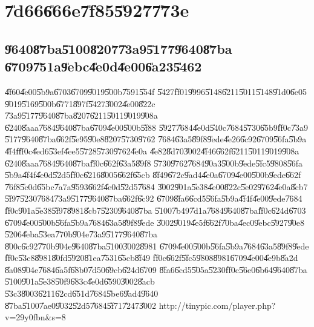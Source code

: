 \documentclass[12pt,a4paper]{article}
\begin{document}
\section{\U{7d66}\U{666e}\U{7f85}\U{5927}\U{773e}}

\subsection{\U{9640}\U{87ba}\U{5100}\U{8207}\U{73a9}\U{5177}\U{9640}\U{87ba}%
\U{6709}\U{751a}\U{9ebc}\U{4e0d}\U{4e00}\U{6a23}\U{5462}}

\U{4f60}\U{4e00}\U{5b9a}\U{6703}\U{6709}\U{9019}\U{500b}\U{7591}\U{554f}%
\U{5427}\U{ff01}\U{9996}\U{5148}\U{6211}\U{5011}\U{5148}\U{91d0}\U{6e05}%
\U{9019}\U{5169}\U{500b}\U{6771}\U{897f}\U{5427}\U{3002}\U{4e00}\U{822c}%
\U{73a9}\U{5177}\U{9640}\U{87ba}\U{8207}\U{6211}\U{5011}\U{9019}\U{908a}%
\U{6240}\U{8aaa}\U{7684}\U{9640}\U{87ba}\U{6709}\U{4e00}\U{500b}\U{5f88}%
\U{5927}\U{7684}\U{4e0d}\U{540c}\U{7684}\U{5730}\U{65b9}\U{ff0c}\U{73a9}%
\U{5177}\U{9640}\U{87ba}\U{662f}\U{5e95}\U{90e8}\U{8207}\U{5730}\U{9762}%
\U{7684}\U{63a5}\U{89f8}\U{9ede}\U{4e26}\U{6c92}\U{6709}\U{56fa}\U{5b9a}%
\U{4f4f}\U{ff0c}\U{4ed6}\U{53ef}\U{4ee5}\U{5728}\U{5730}\U{9762}\U{4e0a}%
\U{4e82}\U{8d70}\U{3002}\U{4f46}\U{662f}\U{6211}\U{5011}\U{9019}\U{908a}%
\U{6240}\U{8aaa}\U{7684}\U{9640}\U{87ba}\U{ff0c}\U{662f}\U{63a5}\U{89f8}%
\U{5730}\U{9762}\U{7684}\U{90a3}\U{500b}\U{9ede}\U{5fc5}\U{9808}\U{56fa}%
\U{5b9a}\U{4f4f}\U{4e0d}\U{52d5}\U{ff0c}\U{6216}\U{8005}\U{662f}\U{65cb}%
\U{8f49}\U{672c}\U{9ad4}\U{4e0a}\U{6709}\U{4e00}\U{500b}\U{9ede}\U{662f}%
\U{76f8}\U{5c0d}\U{65bc}\U{7a7a}\U{9593}\U{662f}\U{4e0d}\U{52d5}\U{7684}%
\U{3002}\U{901a}\U{5e38}\U{4e00}\U{822c}\U{5e02}\U{9762}\U{4e0a}\U{8cb7}%
\U{5f97}\U{5230}\U{7684}\U{73a9}\U{5177}\U{9640}\U{87ba}\U{662f}\U{6c92}%
\U{6709}\U{8fa6}\U{6cd5}\U{56fa}\U{5b9a}\U{4f4f}\U{4e00}\U{9ede}\U{7684}%
\U{ff0c}\U{901a}\U{5e38}\U{5f97}\U{8981}\U{8cb7}\U{5230}\U{9640}\U{87ba}%
\U{5100}\U{7b49}\U{7d1a}\U{7684}\U{9640}\U{87ba}\U{ff0c}\U{624d}\U{6703}%
\U{6709}\U{4e00}\U{500b}\U{56fa}\U{5b9a}\U{7684}\U{63a5}\U{89f8}\U{9ede}%
\U{3002}\U{9019}\U{4e5f}\U{662f}\U{70ba}\U{4ec0}\U{9ebc}\U{5927}\U{90e8}%
\U{5206}\U{4eba}\U{53ea}\U{770b}\U{904e}\U{73a9}\U{5177}\U{9640}\U{87ba}%
\U{800c}\U{6c92}\U{770b}\U{904e}\U{9640}\U{87ba}\U{5100}\U{3002}\U{8981}%
\U{6709}\U{4e00}\U{500b}\U{56fa}\U{5b9a}\U{7684}\U{63a5}\U{89f8}\U{9ede}%
\U{ff0c}\U{53c8}\U{8981}\U{80fd}\U{5920}\U{81ea}\U{7531}\U{65cb}\U{8f49}%
\U{ff0c}\U{662f}\U{5fc5}\U{9808}\U{8981}\U{6709}\U{4e00}\U{4e9b}\U{8a2d}%
\U{8a08}\U{904e}\U{7684}\U{6a5f}\U{68b0}\U{7d50}\U{69cb}\U{624d}\U{6709}%
\U{8fa6}\U{6cd5}\U{505a}\U{5230}\U{ff0c}\U{56e0}\U{6b64}\U{9640}\U{87ba}%
\U{5100}\U{901a}\U{5e38}\U{50f9}\U{683c}\U{4e0d}\U{6590}\U{3002}\U{8acb}%
\U{53c3}\U{8003}\U{6211}\U{62cd}\U{651d}\U{7684}\U{5be6}\U{9ad4}\U{9640}%
\U{87ba}\U{5100}\U{7ae0}\U{9032}\U{52d5}\U{7684}\U{5f71}\U{7247}\U{3002}%
\newline
http://tinypic.com/player.php?v=29y0fbn\&s=8
\end{document}
